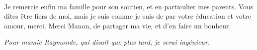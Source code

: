   \paragraph{}
  Je remercie enfin ma famille pour son soutien, et en particulier mes parents.
  Vous dites être fiers de moi, mais je suis comme je suis de par votre éducation et votre amour, merci.
  Merci Manon, de partager ma vie, et d'en faire un bonheur.

\begin{flushright}
    \textit{Pour mamie Raymonde, qui disait que plus tard, je serai ingénieur.}
\end{flushright}
